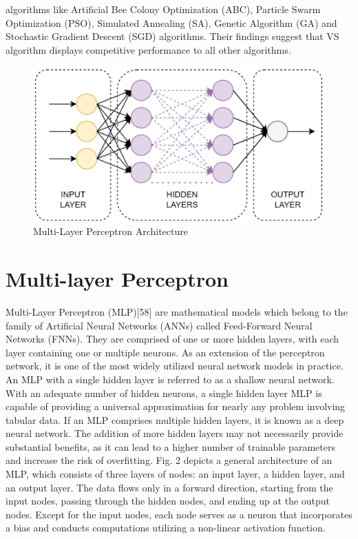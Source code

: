 algorithms like Artificial Bee Colony Optimization (ABC), Particle Swarm Optimization (PSO), Simulated Annealing (SA), Genetic Algorithm (GA) and Stochastic Gradient Descent (SGD) algorithms. Their findings suggest that VS algorithm displays competitive performance to all other algorithms.

\begin{figure}[htbp]
\centering
\includegraphics[width=0.8\linewidth]{images/1d362728b41ec44f42c3da939bd96f4d56037f8d668aacee0fdf6a6fc3303804.jpg}
\caption{Multi-Layer Perceptron Architecture}
\label{fig:2}
\end{figure}


\section{Multi-layer Perceptron}

Multi-Layer Perceptron (MLP)[58] are mathematical models which belong to the family of Artificial Neural Networks (ANNs) called Feed-Forward Neural Networks (FNNs). They are comprised of one or more hidden layers, with each layer containing one or multiple neurons. As an extension of the perceptron network, it is one of the most widely utilized neural network models in practice. An MLP with a single hidden layer is referred to as a shallow neural network. With an adequate number of hidden neurons, a single hidden layer MLP is capable of providing a universal approximation for nearly any problem involving tabular data. If an MLP comprises multiple hidden layers, it is known as a deep neural network. The addition of more hidden layers may not necessarily provide substantial benefits, as it can lead to a higher number of trainable parameters and increase the risk of overfitting. Fig. 2 depicts a general architecture of an MLP, which consists of three layers of nodes: an input layer, a hidden layer, and an output layer. The data flows only in a forward direction, starting from the input nodes, passing through the hidden nodes, and ending up at the output nodes. Except for the input nodes, each node serves as a neuron that incorporates a bias and conducts computations utilizing a non-linear activation function.

